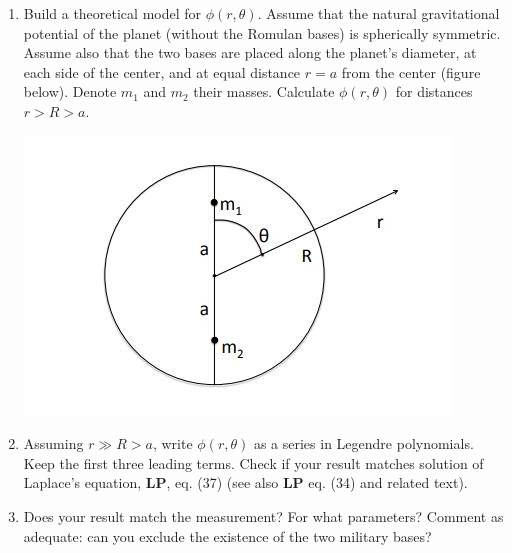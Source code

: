 \documentclass[fleqn]{article}
\begin{document}
\begin{enumerate}
\begin{enumerate}
        \item Build a theoretical model for $\phi(r,\theta)$.  Assume that the natural gravitational potential of the planet (without the Romulan bases) is spherically symmetric. 
        Assume also that the two bases are placed along the planet's diameter, at each side of the center, and at equal distance $r=a$ from the center (figure below).  Denote $m_1$ and $m_2$ their masses. Calculate $\phi(r,\theta)$ for distances $r>R>a$. 
        
        \includegraphics[width=\linewidth]{planetfigure.JPG}
        
        \item Assuming $r \gg R>a$, write $\phi(r,\theta)$ as a series in Legendre polynomials. Keep the first three leading terms. Check if your result matches solution of Laplace's equation, {\bf LP}, eq.  (37) (see also {\bf LP} eq.   (34) and related text).  
        
        \item Does your result match the measurement?  For what parameters?  Comment as adequate: can you exclude the existence of the two military bases?
        
      \end{enumerate}
    
  \end{enumerate}

  \pagebreak
\end{document}
